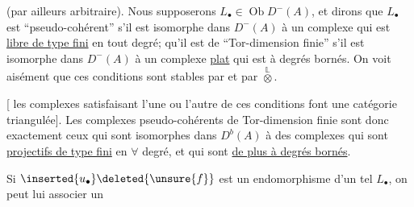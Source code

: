 (par ailleurs arbitraire). Nous supposerons $L_\bullet\in\operatorname{Ob}D^-(A)$, et dirons que $L_\bullet$ est ``pseudo-cohérent'' s'il est isomorphe dans $D^-(A)$ à un complexe qui est \uline{libre de type fini} en tout degré;   qu'il est de ``Tor-dimension finie'' s'il est isomorphe dans $D^-(A)$ à un complexe \uline{plat} qui est  à degrés bornés. On voit aisément que ces conditions sont stables par  et par $\overset{\mathbb L}{\otimes}$.

[ les complexes satisfaisant l'une ou l'autre de ces conditions font  une catégorie triangulée]. Les complexes pseudo-cohérents de Tor-dimension finie sont donc exactement ceux qui sont isomorphes dans $D^b(A)$  à des complexes qui sont \uline{projectifs de type fini} en $\forall$ degré, et qui sont \uline{de plus à degrés bornés}.

Si $\inserted{u_\bullet}\deleted{\unsure{f}}$ est un endomorphisme d'un tel $L_\bullet$, on peut lui associer  un
